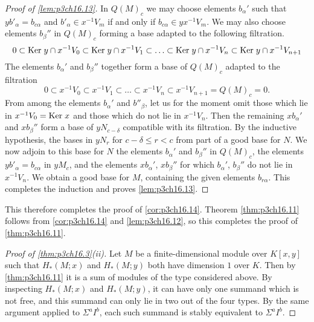 \documentclass[../main]{subfiles}
\begin{document}
\begin{proof}[Proof of \ref{lem:p3ch16.13}]
In $Q(M)_c$ we may choose elements $b_\alpha'$ such that $y b'_\alpha = b_{c \alpha}$ and $b'_\alpha \in x^{-1} V_m$ if and only if $b_{c \alpha} \in y x^{-1} V_m$. We may also choose elements $b_\beta''$ in $Q(M)_c$ forming a base adapted to the following filtration. \[0 \subset \mathrm{Ker}\hspace{0.1cm} y \cap x^{-1} V_0 \subset \mathrm{Ker}\hspace{0.1cm} y \cap x^{-1} V_1 \subset \ldots \subset \mathrm{Ker}\hspace{0.1cm} y \cap x^{-1} V_n \subset \mathrm{Ker}\hspace{0.1cm} y \cap x^{-1} V_{n + 1}\] The elements $b_\alpha'$ and $b_\beta''$ together form a base of $Q(M)_c$ adapted to the filtration \[0 \subset x^{-1} V_0 \subset x^{-1} V_1 \subset \ldots \subset x^{-1} V_n \subset x^{-1} V_{n + 1} = Q(M)_c = 0.\] From among the elements $b_\alpha'$ and $b''_\beta$, let us for the moment omit those which lie in $x^{-1} V_0 = \mathrm{Ker}\hspace{0.1cm} x$ and those which do not lie in $x^{-1} V_n$. Then the remaining $x b_\alpha'$ and $x b_\beta''$ form a base of $y N_{c - \delta}$ compatible with its filtration. By the inductive hypothesis, the bases in $y N_r$ for $c - \delta \le r < c$ from part of a good base for $N$. We now adjoin to this base for $N$ the elements $b_\alpha'$ and $b_\beta''$ in $Q(M)_c$, the elements $y b'_\alpha = b_{c \alpha}$ in $y M_c$, and the elements $x b_\alpha'$, $x b_\beta''$ for which $b_\alpha'$, $b_\beta''$ do not lie in $x^{-1} V_n$. We obtain a good base for $M$, containing the given elements $b_{r \alpha}$. This completes the induction and proves \ref{lem:p3ch16.13}.
\end{proof}

This therefore completes the proof of \ref{cor:p3ch16.14}. Theorem \ref{thm:p3ch16.11} follows from \ref{cor:p3ch16.14} and \ref{lem:p3ch16.12}, so this completes the proof of \ref{thm:p3ch16.11}. 

\begin{proof}[Proof of \ref{thm:p3ch16.3}(ii)]
Let $M$ be a finite-dimensional module over $K[x, y]$ such that $H_\ast(M; x)$ and $H_\ast(M; y)$ both have dimension $1$ over $K$. Then by \ref{thm:p3ch16.11} it is a sum of modules of the type considered above. By inspecting $H_\ast(M; x)$ and $H_\ast(M; y)$, it can have only one summand which is not free, and this summand can only lie in two out of the four types. By the same argument applied to $\Sigma^a I^b$, each such summand is stably equivalent to $\Sigma^a I^b$. 
\end{proof}
\end{document}
